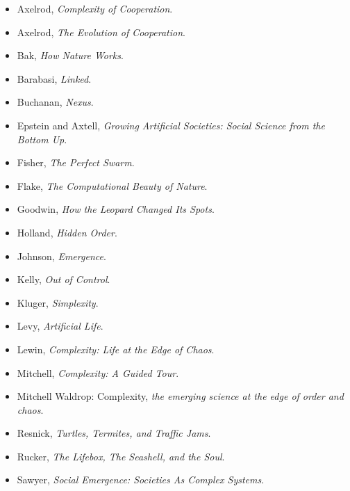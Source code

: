 \documentclass[10pt]{book}
\begin{document}
\begin{itemize}

\item Axelrod, {\it  Complexity of Cooperation}.

\item Axelrod, {\it  The Evolution of Cooperation}.

\item Bak, {\it  How Nature Works}.

\item Barabasi, {\it  Linked}.

\item Buchanan, {\it  Nexus}.

\item Epstein and Axtell, {\it  Growing Artificial Societies: Social Science from the Bottom Up}.

\item Fisher, {\it  The Perfect Swarm}.

\item Flake, {\it  The Computational Beauty of Nature}.

\item Goodwin, {\it  How the Leopard Changed Its Spots}.

\item Holland, {\it  Hidden Order}.

\item Johnson, {\it  Emergence}.

\item Kelly, {\it  Out of Control}.

\item Kluger, {\it  Simplexity}.

\item Levy, {\it  Artificial Life}.

\item Lewin, {\it  Complexity: Life at the Edge of Chaos}.

\item Mitchell, {\it  Complexity: A Guided Tour}.

\item Mitchell Waldrop: Complexity, {\it  the emerging science at the edge of order and chaos}.

\item Resnick, {\it  Turtles, Termites, and Traffic Jams}.

\item Rucker, {\it  The Lifebox, The Seashell, and the Soul}.

\item Sawyer, {\it  Social Emergence: Societies As Complex Systems}.


\end{itemize}
\end{document}

